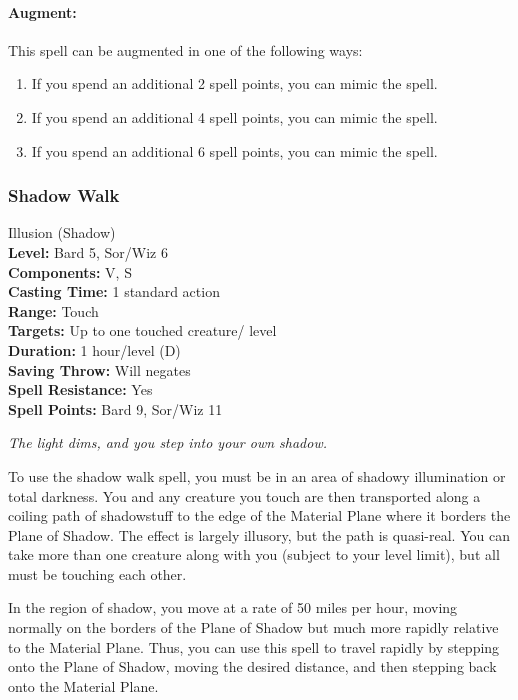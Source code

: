 \paragraph{Augment:} This spell can be augmented in one of the following ways:
\begin{enumerate}
 \item If you spend an additional 2 spell points, you can mimic the  spell.
 \item If you spend an additional 4 spell points, you can mimic the  spell.
 \item If you spend an additional 6 spell points, you can mimic the  spell.
\end{enumerate}
\subsubsection{Shadow Walk}
\label{Spell:ShadowWalk}
Illusion (Shadow)
\\ \textbf{Level:} Bard 5, Sor/Wiz 6
\\ \textbf{Components:} V, S
\\ \textbf{Casting Time:} 1 standard action
\\ \textbf{Range:} Touch
\\ \textbf{Targets:} Up to one touched creature/ level
\\ \textbf{Duration:} 1 hour/level (D)
\\ \textbf{Saving Throw:} Will negates
\\ \textbf{Spell Resistance:} Yes
\\ \textbf{Spell Points:} Bard 9, Sor/Wiz 11

\emph{The light dims, and you step into your own shadow.}

To use the shadow walk spell, you must be in an area of shadowy illumination or total darkness. 
You and any creature you touch are then transported along a coiling path of shadowstuff to the edge of the Material Plane where it borders the Plane of Shadow. 
The effect is largely illusory, but the path is quasi-real. 
You can take more than one creature along with you (subject to your level limit), but all must be touching each other.

In the region of shadow, you move at a rate of 50 miles per hour, moving normally on the borders of the Plane of Shadow but much more rapidly relative to the Material Plane. 
Thus, you can use this spell to travel rapidly by stepping onto the Plane of Shadow, moving the desired distance, and then stepping back onto the Material Plane.

